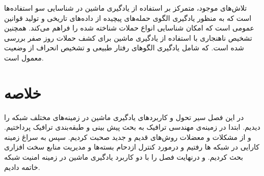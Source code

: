 تلاش‌های موجود، متمرکز بر استفاده از یادگیری ماشین در شناسایی سو استفاده‌ها است که به منظور یادگیری الگوی حمله‌های پیچیده از داده‌های تاریخی و تولید قوانین عمومی است که امکان شناسایی انواع حملات شناخته شده را فراهم می‌کند. همچنین تشخیص ناهنجاری با استفاده از یادگیری ماشین برای کشف حملات روز صفر بررسی شده است. که شامل یادگیری الگوهای رفتار طبیعی و تشخیص انحراف از وضعیت معمول است.\cite{ayoubi2018machine} 


\section{خلاصه}

در این فصل سیر تحول و کاربرد‌های یادگیری ماشین در زمینه‌های مختلف شبکه را دیدیم. ابتدا در زمینه‌ی مهندسی ترافیک به بحث پیش بینی و طبقه‌بندی ترافیک پرداختیم. و از مشکلات و معضلات روش‌های قدیم و جدید صحبت کردیم. سپس به سراغ زمینه کارایی در شبکه ها رفتیم و درمورد کنترل ازدحام بسته‌ها و مدیریت منابع سخت افزاری بحث کردیم. و درنهایت فصل را با دو کاربرد یادگیری ماشین در زمینه امنیت شبکه خاتمه دادیم.





\newpage
